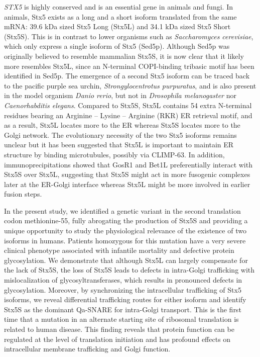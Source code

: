 \emph{STX5} is highly conserved and is an essential gene in animals and fungi\cite{dickinson_high-throughput_2016,koscielny_international_2014}. In animals, Stx5 exists as a long and a short isoform translated from the same mRNA: 39.6 kDa sized Stx5 Long (Stx5L) and 34.1 kDa sized Stx5 Short (Stx5S)\cite{linders_stx5-mediated_2019,hui_isoform_1997}. This is in contrast to lower organisms such as \emph{Saccharomyces cerevisiae}, which only express a single isoform of Stx5 (Sed5p). Although Sed5p was originally believed to resemble mammalian Stx5S\cite{linders_stx5-mediated_2019}, it is now clear that it likely more resembles Stx5L, since an N-terminal COPI-binding tribasic motif has been identified in Sed5p\cite{gao_multiple_2020}. The emergence of a second Stx5 isoform can be traced back to the pacific purple sea urchin, \emph{Strongylocentrotus purpuratus}, and is also present in the model organism \emph{Danio rerio}, but not in \emph{Drosophila melanogaster} nor \emph{Caenorhabditis elegans}. Compared to Stx5S, Stx5L contains 54 extra N-terminal residues bearing an Arginine – Lysine – Arginine (RKR) ER retrieval motif, and as a result, Stx5L locates more to the ER whereas Stx5S locates more to the Golgi network\cite{linders_stx5-mediated_2019,hui_isoform_1997,dominguez_gp25l/emp24/p24_1998,miyazaki_contribution_2012,suga_syntaxin_2009}. The evolutionary necessity of the two Stx5 isoforms remains unclear but it has been suggested that Stx5L is important to maintain ER structure by binding microtubules, possibly via CLIMP-63\cite{miyazaki_contribution_2012,avci_intramembrane_2019}. In addition, immunoprecipitations showed that GosR1 and Bet1L preferentially interact with Stx5S over Stx5L\cite{hay_mammalian_1996,shestakova_interaction_2007}, suggesting that Stx5S might act in more fusogenic complexes later at the ER-Golgi interface whereas Stx5L might be more involved in earlier fusion steps.

In the present study, we identified a genetic variant in the second translation codon methionine-55, fully abrogating the production of Stx5S and providing a unique opportunity to study the physiological relevance of the existence of two isoforms in humans. Patients homozygous for this mutation have a very severe clinical phenotype associated with infantile mortality and defective protein glycosylation. We demonstrate that although Stx5L can largely compensate for the lack of Stx5S, the loss of Stx5S leads to defects in intra-Golgi trafficking with mislocalization of glycosyltransferases, which results in pronounced defects in glycosylation. Moreover, by synchronizing the intracellular trafficking of Stx5 isoforms, we reveal differential trafficking routes for either isoform and identify Stx5S as the dominant Qa-SNARE for intra-Golgi transport. This is the first time that a mutation in an alternate starting site of ribosomal translation is related to human disease. This finding reveals that protein function can be regulated at the level of translation initiation and has profound effects on intracellular membrane trafficking and Golgi function.

